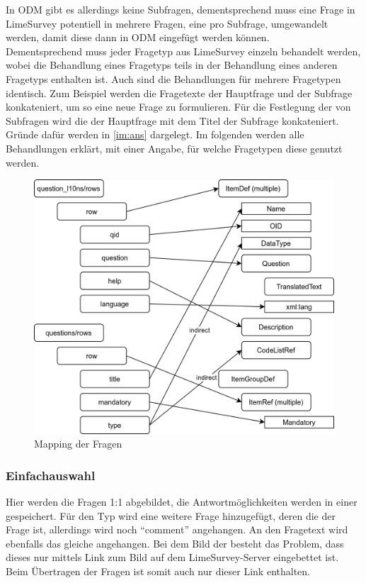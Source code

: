 In ODM gibt es allerdings keine Subfragen, dementsprechend muss eine Frage in LimeSurvey potentiell in mehrere Fragen, eine pro Subfrage, umgewandelt werden, damit diese dann in ODM eingefügt werden können.\\

Dementsprechend muss jeder Fragetyp aus LimeSurvey einzeln behandelt werden, wobei die Behandlung eines Fragetyps teils in der Behandlung eines anderen Fragetyps enthalten ist.
Auch sind die Behandlungen für mehrere Fragetypen identisch.
Zum Beispiel werden die Fragetexte der Hauptfrage und der Subfrage konkateniert, um so eine neue Frage  zu formulieren.
Für die Festlegung der  von Subfragen wird die  der Hauptfrage mit dem Titel der Subfrage konkateniert.
Gründe dafür werden in \cref{im:ans} dargelegt.
Im folgenden werden alle Behandlungen erklärt, mit einer Angabe, für welche Fragetypen diese genutzt werden.

\begin{figure}[h]
			\centering
			\includegraphics[width=.95\textwidth]{./img/m_questions.png}
			\caption{Mapping der Fragen}
\end{figure}

\subsubsection{Einfachauswahl}
\label{e:sc}

Hier werden die Fragen 1:1 abgebildet, die Antwortmöglichkeiten werden in einer  gespeichert.
Für den Typ  wird eine weitere Frage hinzugefügt, deren  die  der Frage ist, allerdings wird noch \enquote{comment} angehangen.
An den Fragetext wird ebenfalls das gleiche angehangen.
Bei dem Bild der  besteht das Problem, dass dieses nur mittels Link zum Bild auf dem LimeSurvey-Server eingebettet ist.
Beim Übertragen der Fragen ist somit auch nur dieser Link enthalten.

